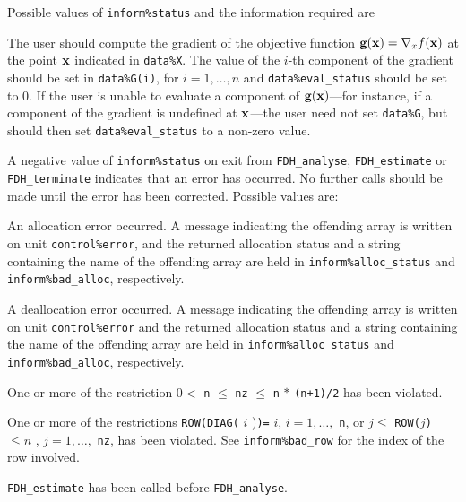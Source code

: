 \documentclass{galahad}
\newcommand{\packagename}{FDH}
\begin{document}
Possible values of {\tt inform\%status} and the information required are
\begin{description}
 The user should compute the gradient 
     of the objective function ${\mathbf{g}}({\mathbf{x}}) = \nabla_x f({\mathbf{x}})$ at the 
     point ${\mathbf{x}}$ indicated in {\tt data\%X}.
     The value of the $i$-th component of the gradient should be set 
     in {\tt data\%G(i)},      for $i = 1, \ldots, n$ and 
     {\tt data\%eval\_status} should be set to 0. If the user is
     unable to evaluate a component of ${\mathbf{g}}({\mathbf{x}})$---for instance, 
     if a component of the gradient is
     undefined at ${\mathbf{x}}$---the user need not set {\tt data\%G}, but
     should then set {\tt data\%eval\_status} to a non-zero value.
\end{description}



\galerrors
A negative value of {\tt inform\%status} on exit from 
{\tt \packagename\_analyse},
{\tt \packagename\_estimate}
or 
{\tt \packagename\_terminate}
indicates that an error has occurred. No further calls should be made
until the error has been corrected. Possible values are:

\begin{description}

 An allocation error occurred. 
A message indicating the offending
array is written on unit {\tt control\%error}, and the returned allocation 
status and a string containing the name of the offending array
are held in {\tt inform\%alloc\_\-status}
and {\tt inform\%bad\_alloc}, respectively.

 A deallocation error occurred. 
A message indicating the offending 
array is written on unit {\tt control\%error} and the returned allocation 
status and a string containing the name of the offending array
are held in {\tt inform\%alloc\_\-status}
and {\tt inform\%bad\_alloc}, respectively.

 One or more of the restriction 
$0 <$ {\tt n} $\le$ {\tt nz} $\le$ {\tt n} $\ast$ {\tt (n+1)/2}
  has been violated.

 One or more of the restrictions
{\tt ROW(DIAG(} $i$ {)\tt)=} $i$, $i = 1, \ldots,$ {\tt n}, or
$j \leq$ {\tt ROW(}$j${\tt)} $\leq n$ , $j = 1, \ldots,$ {\tt nz},
  has been violated. See {\tt inform\%bad\_row} 
for the index of the row involved.

  {\tt \packagename\_estimate} has been called
before {\tt \packagename\_analyse}. 

\end{description}
\end{document}
